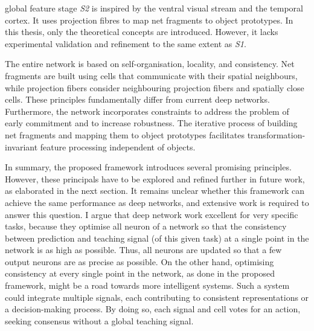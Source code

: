 \The global feature stage \emph{S2} is inspired by the ventral visual stream and the temporal cortex.
It uses projection fibres to map net fragments to object prototypes.
In this thesis, only the theoretical concepts are introduced. However, it lacks experimental validation and refinement to the same extent as \emph{S1}.

The entire network is based on self-organisation, locality, and consistency. Net fragments are built using cells that communicate with their spatial neighbours, while projection fibers consider neighbouring projection fibers and spatially close cells. These principles fundamentally differ from current deep networks.
Furthermore, the network  incorporates constraints to address the problem of early commitment and to increase robustness.
The iterative process of building net fragments and mapping them to object prototypes facilitates transformation-invariant feature processing independent of objects.

In summary, the proposed framework introduces several promising principles.
However, these principals have to be explored and refined further in future work, as elaborated in the next section.
It remains unclear whether this framework can achieve the same performance as deep networks, and extensive work is required to answer this question.
I argue that deep network work excellent for very specific tasks, because they optimise all neuron of a network so that the consistency between prediction and teaching signal (of this given task)
at a single point in the network is as high as possible.
Thus, all neurons are updated so that a few output neurons are as precise as possible.
On the other hand, optimising consistency at every single point in the network, as done in the proposed framework, might be a road towards more intelligent systems. Such a system could integrate multiple signals, each contributing to consistent representations or a decision-making process. By doing so, each signal and cell votes for an action, seeking consensus without a global teaching signal.



